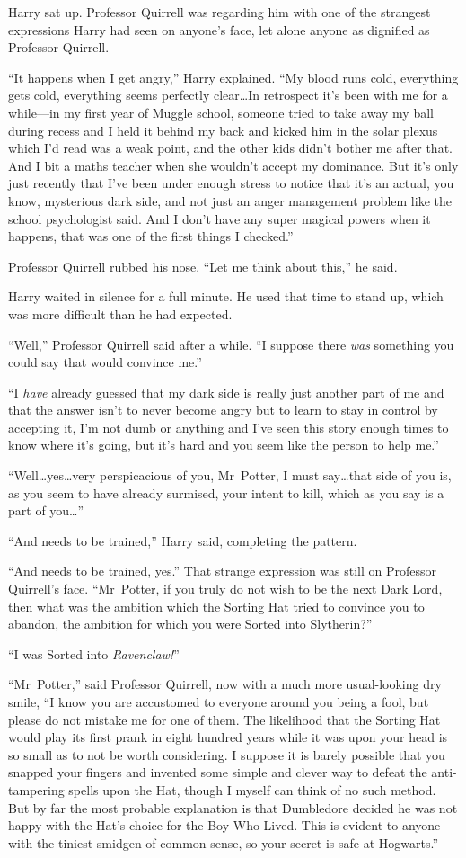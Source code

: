 Harry sat up. Professor Quirrell was regarding him with one of the strangest expressions Harry had seen on anyone’s face, let alone anyone as dignified as Professor Quirrell.

“It happens when I get angry,” Harry explained. “My blood runs cold, everything gets cold, everything seems perfectly clear…In retrospect it’s been with me for a while—in my first year of Muggle school, someone tried to take away my ball during recess and I held it behind my back and kicked him in the solar plexus which I’d read was a weak point, and the other kids didn’t bother me after that. And I bit a maths teacher when she wouldn’t accept my dominance. But it’s only just recently that I’ve been under enough stress to notice that it’s an actual, you know, mysterious dark side, and not just an anger management problem like the school psychologist said. And I don’t have any super magical powers when it happens, that was one of the first things I checked.”

Professor Quirrell rubbed his nose. “Let me think about this,” he said.

Harry waited in silence for a full minute. He used that time to stand up, which was more difficult than he had expected.

“Well,” Professor Quirrell said after a while. “I suppose there \emph{was} something you could say that would convince me.”

“I \emph{have} already guessed that my dark side is really just another part of me and that the answer isn’t to never become angry but to learn to stay in control by accepting it, I’m not dumb or anything and I’ve seen this story enough times to know where it’s going, but it’s hard and you seem like the person to help me.”

“Well…yes…very perspicacious of you, Mr~Potter, I must
say…that side of you is, as you seem to have already surmised, your intent to kill, which as you say is a part of you…”

“And needs to be trained,” Harry said, completing the pattern.

“And needs to be trained, yes.” That strange expression was still on Professor Quirrell’s face. “Mr~Potter, if you truly do not wish to be the next Dark Lord, then what was the ambition which the Sorting Hat tried to convince you to abandon, the ambition for which you were Sorted into Slytherin?”

“I was Sorted into \emph{Ravenclaw!}”

“Mr~Potter,” said Professor Quirrell, now with a much more usual-looking dry smile, “I know you are accustomed to everyone around you being a fool, but please do not mistake me for one of them. The likelihood that the Sorting Hat would play its first prank in eight hundred years while it was upon your head is so small as to not be worth considering. I suppose it is barely possible that you snapped your fingers and invented some simple and clever way to defeat the anti-tampering spells upon the Hat, though I myself can think of no such method. But by far the most probable explanation is that Dumbledore decided he was not happy with the Hat’s choice for the Boy-Who-Lived. This is evident to anyone with the tiniest smidgen of common sense, so your secret is safe at Hogwarts.”

